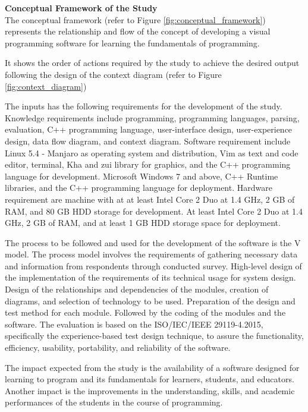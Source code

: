 \flushleft
\textbf{Conceptual Framework of the Study}\\

\justifying
\parx
The conceptual framework (refer to Figure \ref{fig:conceptual_framework}) represents the relationship
and flow of the concept of developing a visual programming software for learning the
fundamentals of programming.

\parx
It shows the order of actions required by the study to achieve the desired
output following the design of the context diagram (refer to Figure \ref{fig:context_diagram})

\parx
The inputs has the following requirements for the development of the study.
Knowledge requirements include programming, programming languages, parsing,
evaluation, C++ programming language, user-interface design, user-experience
design, data flow diagram, and context diagram.  Software requirement include
Linux 5.4 - Manjaro as operating system and distribution, Vim as text and code
editor, terminal, Kha and zui library for graphics, and the C++ programming
language for development. Microsoft Windows 7 and above, C++ Runtime libraries,
and the C++ programming language for deployment.  Hardware requirement are
machine with at at least Intel Core 2 Duo at 1.4 GHz, 2 GB of RAM, and 80 GB
HDD storage for development. At least Intel Core 2 Duo at 1.4 GHz, 2 GB of RAM,
and at least 1 GB HDD storage space for deployment.

\parx
The process to be followed and used for the development of the software is the V model.
The process model involves the requirements of gathering necessary data and information
from respondents through conducted survey. High-level design of the implementation of
the requirements of its technical usage for system design. Design of the relationships
and dependencies of the modules, creation of diagrams, and selection of technology to
be used. Preparation of the design and test method for each module. Followed by the
coding of the modules and the software. The evaluation is based on the ISO/IEC/IEEE
29119-4.2015, specifically the experience-based test design technique, to assure the
functionality, efficiency, usability, portability, and reliability of the software.

\parx
The impact expected from the study is the availability of a software designed for
learning to program and its fundamentals for learners, students, and educators.
Another impact is the improvements in the understanding, skills, and academic
performances of the students in the course of programming.

